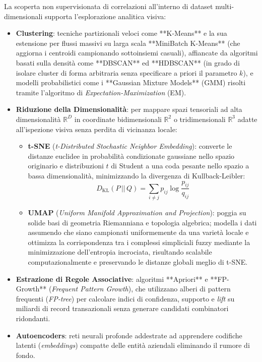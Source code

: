 \documentclass[11pt, a4paper]{article}
\begin{document}
La scoperta non supervisionata di correlazioni all'interno di dataset multi-dimensionali supporta l'esplorazione analitica visiva:
\begin{itemize}
    \item \textbf{Clustering}: tecniche partizionali veloci come **K-Means** e la sua estensione per flussi massivi su larga scala **MiniBatch K-Means** (che aggiorna i centroidi campionando sottoinsiemi casuali), affiancate da algoritmi basati sulla densità come **DBSCAN** ed **HDBSCAN** (in grado di isolare cluster di forma arbitraria senza specificare a priori il parametro $k$), e modelli probabilistici come i **Gaussian Mixture Models** (GMM) risolti tramite l'algoritmo di \emph{Expectation-Maximization} (EM).
    \item \textbf{Riduzione della Dimensionalità}: per mappare spazi tensoriali ad alta dimensionalità $\mathbb{R}^D$ in coordinate bidimensionali $\mathbb{R}^2$ o tridimensionali $\mathbb{R}^3$ adatte all'ispezione visiva senza perdita di vicinanza locale:
    \begin{itemize}
        \item \textbf{t-SNE} (\emph{t-Distributed Stochastic Neighbor Embedding}): converte le distanze euclidee in probabilità condizionate gaussiane nello spazio originario e distribuzioni $t$ di Student a una coda pesante nello spazio a bassa dimensionalità, minimizzando la divergenza di Kullback-Leibler:
        \begin{equation}
            D_{\text{KL}}(P \,||\, Q) = \sum_{i \neq j} p_{ij} \log \frac{p_{ij}}{q_{ij}}
        \end{equation}
        \item \textbf{UMAP} (\emph{Uniform Manifold Approximation and Projection}): poggia su solide basi di geometria Riemanniana e topologia algebrica; modella i dati assumendo che siano campionati uniformemente da una varietà locale e ottimizza la corrispondenza tra i complessi simpliciali fuzzy mediante la minimizzazione dell'entropia incrociata, risultando scalabile computazionalmente e preservando le distanze globali meglio di t-SNE.
    \end{itemize}
    \item \textbf{Estrazione di Regole Associative}: algoritmi **Apriori** e **FP-Growth** (\emph{Frequent Pattern Growth}), che utilizzano alberi di pattern frequenti (\emph{FP-tree}) per calcolare indici di confidenza, supporto e \emph{lift} su miliardi di record transazionali senza generare candidati combinatori ridondanti.
    \item \textbf{Autoencoders}: reti neurali profonde addestrate ad apprendere codifiche latenti (\emph{embeddings}) compatte delle entità aziendali eliminando il rumore di fondo.
\end{itemize}
\end{document}
